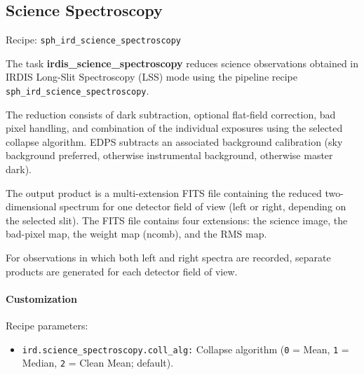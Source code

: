 \subsection{Science Spectroscopy}

Recipe: \texttt{sph\_ird\_science\_spectroscopy}

The task \textbf{irdis\_science\_spectroscopy} reduces science observations obtained in IRDIS Long-Slit Spectroscopy (LSS) mode using the pipeline recipe
\texttt{sph\_ird\_science\_spectroscopy}.

The reduction consists of dark subtraction, optional flat-field correction, bad
pixel handling, and combination of the individual exposures using the selected
collapse algorithm. EDPS subtracts an associated background calibration (sky background preferred, otherwise instrumental background, otherwise master dark).

The output product is a multi-extension FITS file containing the reduced
two-dimensional spectrum for one detector field of view (left or right,
depending on the selected slit). The FITS file contains four extensions: the science image, the bad-pixel map, the weight map (ncomb), and the RMS map.

For observations in which both left and right spectra are recorded, separate
products are generated for each detector field of view.

\paragraph{Customization}

Recipe parameters:

\begin{itemize}

\item \texttt{ird.science\_spectroscopy.coll\_alg:}
Collapse algorithm
(\texttt{0} = Mean,
 \texttt{1} = Median,
 \texttt{2} = Clean Mean; default).

\end{itemize}
